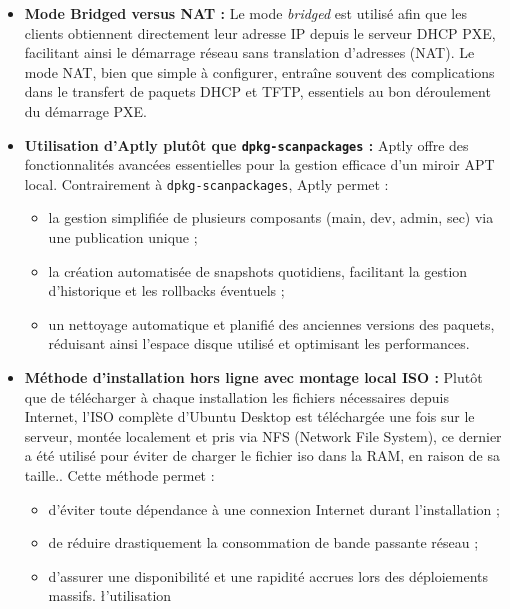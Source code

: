 \documentclass[a4paper,12pt]{article}
\begin{document}
\begin{itemize}

\item \textbf{Mode Bridged versus NAT :} 
Le mode \textit{bridged} est utilisé afin que les clients obtiennent directement leur adresse IP depuis le serveur DHCP PXE, facilitant ainsi le démarrage réseau sans translation d’adresses (NAT). Le mode NAT, bien que simple à configurer, entraîne souvent des complications dans le transfert de paquets DHCP et TFTP, essentiels au bon déroulement du démarrage PXE.

\item \textbf{Utilisation d’Aptly plutôt que \texttt{dpkg-scanpackages} :} 
Aptly offre des fonctionnalités avancées essentielles pour la gestion efficace d'un miroir APT local. Contrairement à \texttt{dpkg-scanpackages}, Aptly permet :
\begin{itemize}
    \item la gestion simplifiée de plusieurs composants (main, dev, admin, sec) via une publication unique ;
    \item la création automatisée de snapshots quotidiens, facilitant la gestion d'historique et les rollbacks éventuels ;
    \item un nettoyage automatique et planifié des anciennes versions des paquets, réduisant ainsi l'espace disque utilisé et optimisant les performances.
\end{itemize}

\item \textbf{Méthode d'installation hors ligne avec montage local ISO :} 
Plutôt que de télécharger à chaque installation les fichiers nécessaires depuis Internet, l’ISO complète d'Ubuntu Desktop est téléchargée une fois sur le serveur, montée localement et pris via NFS (Network File System), ce dernier a été utilisé pour éviter de charger le fichier iso dans la RAM, en raison de sa taille.. Cette méthode permet :
\begin{itemize}
    \item d'éviter toute dépendance à une connexion Internet durant l'installation ;
    \item de réduire drastiquement la consommation de bande passante réseau ;
    \item d'assurer une disponibilité et une rapidité accrues lors des déploiements massifs.
    \l'utilisation 
\end{itemize}


\end{itemize}
\end{document}
